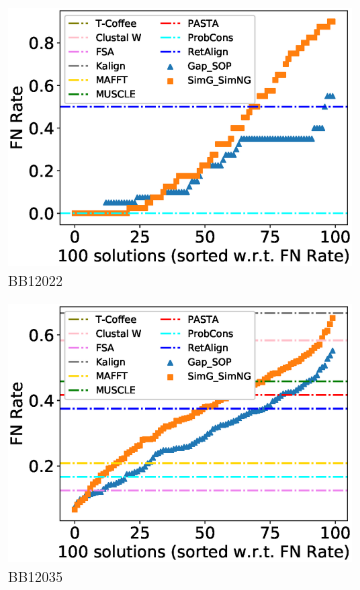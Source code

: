 \begin{figure}[!htbp]
\begin{adjustwidth}{-1.5cm}{-1cm}
		\begin{subfigure}{0.22\textwidth}
			\includegraphics[width=\columnwidth]{Figure/summary/precomputedInit/Balibase/BB12022_fnrate_density_single_run}
			\caption{BB12022}
		\end{subfigure}
		\begin{subfigure}{0.22\textwidth}
			\includegraphics[width=\columnwidth]{Figure/summary/precomputedInit/Balibase/BB12035_fnrate_density_single_run}
			\caption{BB12035}
		\end{subfigure}
		\begin{subfigure}{0.22\textwidth}

\end{subfigure}
\end{adjustwidth}
\end{figure}
